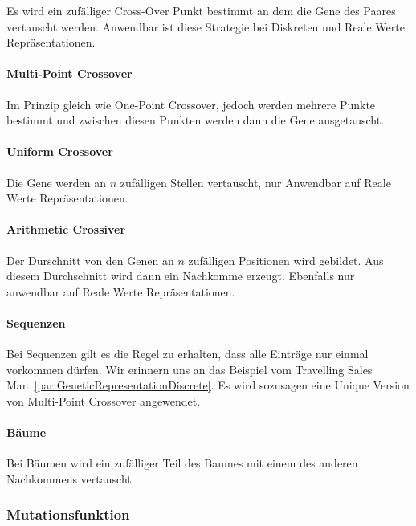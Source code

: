           Es wird ein zufälliger Cross-Over Punkt bestimmt an dem die Gene des Paares vertauscht werden.
          Anwendbar ist diese Strategie bei Diskreten und Reale Werte Repräsentationen.

        \paragraph{Multi-Point Crossover}

          Im Prinzip gleich wie One-Point Crossover, jedoch werden mehrere Punkte bestimmt und
          zwischen diesen Punkten werden dann die Gene ausgetauscht.

        \paragraph{Uniform Crossover}

          Die Gene werden an \(n\) zufälligen Stellen vertauscht, nur Anwendbar auf Reale Werte Repräsentationen.

        \paragraph{Arithmetic Crossiver}

          Der Durschnitt von den Genen an \(n\) zufälligen Positionen wird gebildet.
          Aus diesem Durchschnitt wird dann ein Nachkomme erzeugt.
          Ebenfalls nur anwendbar auf Reale Werte Repräsentationen.

        \paragraph{Sequenzen}

          Bei Sequenzen gilt es die Regel zu erhalten, dass alle Einträge nur einmal vorkommen dürfen.
          Wir erinnern uns an das Beispiel vom Travelling Sales Man~\ref{par:GeneticRepresentationDiscrete}.
          Es wird sozusagen eine Unique Version von  Multi-Point Crossover angewendet.

        \paragraph{Bäume}

          Bei Bäumen wird ein zufälliger Teil des Baumes mit einem des anderen Nachkommens vertauscht.

    \subsubsection{Mutationsfunktion}

